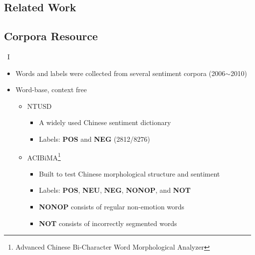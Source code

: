 \documentclass[compress]{beamer}
\begin{document}
\begin{CJK*}{UTF8}{bsmi}
\section{Related Work}
    \subsection{Corpora Resource}
        \begin{frame}{\subsecname\ I}
            \begin{itemize}
                \item Words and labels were collected from several sentiment corpora (2006$\sim$2010)
                \item Word-base, context free
                \begin{itemize}
                    \item NTUSD
                        \begin{itemize}
                            \item A widely used Chinese sentiment dictionary
                            \item Labels: \textbf{POS} and \textbf{NEG} (2812/8276) 
                        \end{itemize}
                    \item ACIBiMA\footnote{Advanced Chinese Bi-Character Word Morphological Analyzer}
                        \begin{itemize}
                            \item Built to test Chinese morphological structure and sentiment
                            \item Labels: \textbf{POS}, \textbf{NEU}, \textbf{NEG}, \textbf{NONOP}, and \textbf{NOT}
                            \item \textbf{NONOP} consists of regular non-emotion words
                            \item \textbf{NOT} consists of incorrectly segmented words
                        \end{itemize}
                \end{itemize}
            \end{itemize}
        \end{frame}


\end{CJK*}
\end{document}
